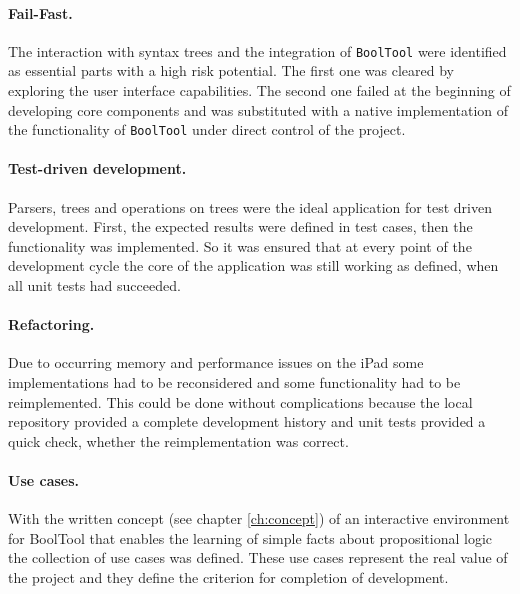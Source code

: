 \paragraph{Fail-Fast.} The interaction with syntax trees and 
the integration of \verb=BoolTool= were identified as essential parts with a high risk potential. 
The first one was cleared by exploring the user interface capabilities.
The second one failed at the beginning of developing core components 
and was substituted with a native implementation of the functionality of \verb=BoolTool=
under direct control of the project.

\paragraph{Test-driven development.}

Parsers, trees and operations on trees were the ideal application for test driven development.
First, the expected results were defined in test cases, then the functionality was implemented.
So it was ensured that at every point of the development cycle 
the core of the application was still working as defined,
when all unit tests had succeeded.

\paragraph{Refactoring.}
Due to occurring memory and performance issues on the iPad
some implementations had to be reconsidered 
and some functionality had to be reimplemented.
This could be done without complications because 
the local repository provided a complete development history 
and unit tests provided a quick check, whether the reimplementation was correct.

\paragraph{Use cases.}
With the written concept (see chapter \vref{ch:concept}) of an interactive environment for BoolTool 
that enables the learning  of simple facts about propositional logic the collection of use cases was defined. 
These use cases represent the real value of the project 
and they define the criterion for completion of development.


